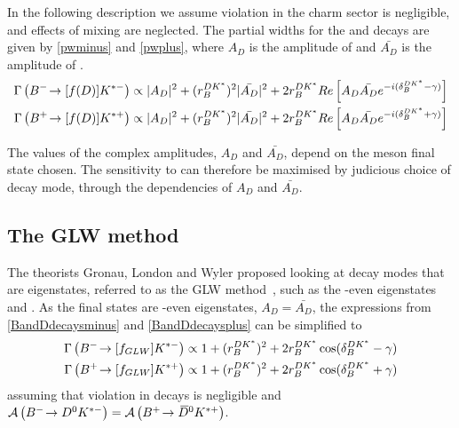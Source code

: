 In the following description we assume \CP violation in the charm sector is negligible, and effects of \D mixing are neglected. The partial widths for the \Bm and \Bp decays are given by \eqn\ref{pwminus} and \ref{pwplus}, where $A_D$ is the amplitude of  and $\bar{A_{D}}$ is the amplitude of .
\begin{align}
\Gamma\left({{{B}^-}}\!\rightarrow [f(D)]{\ensuremath{{K}^{*-}}}\right) &\propto |A_D|^2 + (r_B^{DK^*})^2 |\bar{A_{D}}|^2 + 2r_B^{DK^*} Re\left[ A_D \bar{A_{D}} e^{-i(\delta_B^{DK^*} - \gamma)} \right] \label{pwminus} \\
\Gamma\left({{{B}^+}}\!\rightarrow [f(D)]{\ensuremath{{K}^{*+}}}\right) &\propto |A_D|^2 + (r_B^{DK^*})^2 |\bar{A_{D}}|^2 + 2r_B^{DK^*} Re\left[ A_D \bar{A_{D}} e^{-i(\delta_B^{DK^*} + \gamma)} \right] \label{pwplus}
\end{align}

The values of the complex amplitudes, $A_{D}$ and $\bar{A_{D}}$, depend on the \D meson final state chosen. The sensitivity to \Pgamma can therefore be maximised by judicious choice of \Dz decay mode, through the dependencies of $A_{D}$ and $\bar{A_{D}}$.

\subsection{The GLW method}
\label{sec:theory:glw}

The theorists Gronau, London and Wyler proposed looking at \D decay modes that are \CP eigenstates, referred to as the GLW method~\cite{GL,GW}, such as the \CP-even eigenstates \decay{\D}{\Kp\Km} and \decay{\D}{\pip\pim}. As the final states are \CP-even eigenstates, $A_{D} = \bar{A_{D}}$, the expressions from \eqn\ref{BandDdecaysminus} and \ref{BandDdecaysplus} can be simplified to
\begin{align}
\Gamma\left({{{B}^-}}\!\rightarrow [f_{GLW}]{\ensuremath{{K}^{*-}}}\right) &\propto 1 + (r_B^{DK^*})^2 + 2r_B^{DK^*}\cos(\delta_B^{DK^*} - \gamma) \label{widthBm} \\
\Gamma\left({{{B}^+}}\!\rightarrow [f_{GLW}]{\ensuremath{{K}^{*+}}}\right) &\propto 1 + (r_B^{DK^*})^2 + 2r_B^{DK^*}\cos(\delta_B^{DK^*} + \gamma) \label{widthBp}
\end{align}
assuming that \CP violation in \D decays is negligible and $\mathcal{A}\left({{{B}^-}}\!\rightarrow {\ensuremath{{D}^0}}{\ensuremath{{K}^{*-}}}\right) = \mathcal{A}\left({{{B}^+}}\!\rightarrow {\ensuremath{{\kern 0.2em\overline{\kern -0.2em D}{}}{}^0}}{\ensuremath{{K}^{*+}}}\right)$. 

